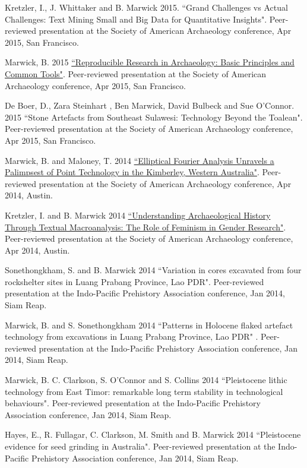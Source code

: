 \ind Kretzler, I., J. Whittaker and B. Marwick 2015. ``Grand Challenges vs Actual Challenges: Text Mining Small and Big Data for Quantitative Insights".  Peer-reviewed presentation at the Society of American Archaeology conference, Apr 2015, San Francisco.

\ind Marwick, B. 2015 {\href{https://github.com/benmarwick/SAA2015-Open-Methods}{``Reproducible Research in Archaeology: Basic Principles and Common Tools"}}. Peer-reviewed presentation at the Society of American Archaeology conference, Apr 2015, San Francisco.

\ind De Boer, D., Zara Steinhart , Ben Marwick, David Bulbeck and Sue O'Connor. 2015 ``Stone Artefacts from Southeast Sulawesi: Technology Beyond the Toalean". Peer-reviewed presentation at the Society of American Archaeology conference, Apr 2015, San Francisco.

\ind Marwick, B. and Maloney, T. 2014 {\href{https://github.com/benmarwick/marwick-and-maloney-saa2014}{``Elliptical Fourier Analysis Unravels a Palimpsest of Point Technology  in the Kimberley, Western Australia"}}. Peer-reviewed presentation at the Society of American Archaeology conference, Apr 2014, Austin.

\ind Kretzler, I. and B. Marwick 2014 {\href{https://github.com/benmarwick/kretzler-and-marwick-saa2014}{``Understanding Archaeological History Through Textual Macroanalysis: The Role of Feminism in Gender Research"}}. Peer-reviewed presentation at the Society of American Archaeology conference, Apr 2014, Austin.

\ind Sonethongkham, S. and B. Marwick 2014 ``Variation in cores excavated from four rockshelter sites in Luang Prabang Province, Lao PDR". Peer-reviewed presentation at the Indo-Pacific Prehistory Association conference, Jan 2014, Siam Reap.

\ind Marwick, B.  and S. Sonethongkham 2014 ``Patterns in Holocene flaked artefact technology from excavations in Luang Prabang Province, Lao PDR" . Peer-reviewed presentation at the Indo-Pacific Prehistory Association conference, Jan 2014, Siam Reap.

\ind Marwick, B. C. Clarkson, S. O’Connor and S. Collins 2014 ``Pleistocene lithic technology from East Timor: remarkable long term stability in technological behaviours". Peer-reviewed presentation at the Indo-Pacific Prehistory Association conference, Jan 2014, Siam Reap.

\ind Hayes, E., R. Fullagar, C. Clarkson, M. Smith and B. Marwick 2014 ``Pleistocene evidence for seed grinding in Australia". Peer-reviewed presentation at the Indo-Pacific Prehistory Association conference, Jan 2014, Siam Reap.


